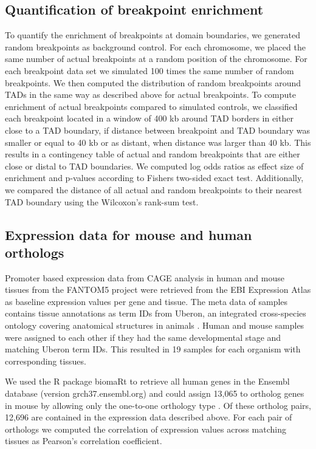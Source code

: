 \documentclass[a4paper,twoside=true,openright,parskip=full,chapterprefix=true,11pt,headings=normal,bibliography=totoc,listof=totoc,titlepage=on,captions=tableabove,draft=false]{scrreprt}
\theoremstyle{definition}
\theoremstyle{definition}
\theoremstyle{definition}
\theoremstyle{remark}
\begin{document}
\subsection{Quantification of breakpoint
enrichment}\label{quantification-of-breakpoint-enrichment}

To quantify the enrichment of breakpoints at domain boundaries, we
generated random breakpoints as background control. For each chromosome,
we placed the same number of actual breakpoints at a random position of
the chromosome. For each breakpoint data set we simulated 100 times the
same number of random breakpoints. We then computed the distribution of
random breakpoints around TADs in the same way as described above for
actual breakpoints. To compute enrichment of actual breakpoints compared
to simulated controls, we classified each breakpoint located in a window
of 400 kb around TAD borders in either close to a TAD boundary, if
distance between breakpoint and TAD boundary was smaller or equal to 40
kb or as distant, when distance was larger than 40 kb. This results in a
contingency table of actual and random breakpoints that are either close
or distal to TAD boundaries. We computed log odds ratios as effect size
of enrichment and p-values according to Fishers two-sided exact test.
Additionally, we compared the distance of all actual and random
breakpoints to their nearest TAD boundary using the Wilcoxon's rank-sum
test.

\subsection{Expression data for mouse and human
orthologs}\label{expression-data-for-mouse-and-human-orthologs}

Promoter based expression data from CAGE analysis in human and mouse
tissues from the FANTOM5 project \citep{Forrest2014} were retrieved from
the EBI Expression Atlas \citep{Hinrichs2006} as baseline expression
values per gene and tissue. The meta data of samples contains tissue
annotations as term IDs from Uberon, an integrated cross-species
ontology covering anatomical structures in animals \citep{Herrero2016}.
Human and mouse samples were assigned to each other if they had the same
developmental stage and matching Uberon term IDs. This resulted in 19
samples for each organism with corresponding tissues.

We used the R package biomaRt to retrieve all human genes in the Ensembl
database (version grch37.ensembl.org) and could assign 13,065 to
ortholog genes in mouse by allowing only the one-to-one orthology type
\citep{Herrero2016}. Of these ortholog pairs, 12,696 are contained in
the expression data described above. For each pair of orthologs we
computed the correlation of expression values across matching tissues as
Pearson's correlation coefficient.
\end{document}
